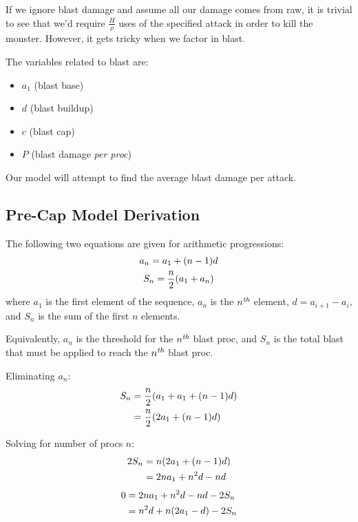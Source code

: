\documentclass{article}
\begin{document}
If we ignore blast damage and assume all our damage comes from raw, it is trivial to see that we'd require $\frac{H}{\rho}$ uses of the specified attack in order to kill the monster. However, it gets tricky when we factor in blast.

The variables related to blast are:
\begin{itemize}
    \item $a_1$ (blast base)
    \item $d$ (blast buildup)
    \item $c$ (blast cap)
    \item $P$ (blast damage \textit{per proc})
\end{itemize}

Our model will attempt to find the average blast damage per attack.


\subsection{Pre-Cap Model Derivation}%
\label{sub:pre_cap_model_derivation}

The following two equations are given for arithmetic progressions:
\begin{gather}
    a_n = a_1 + \parens*{n - 1} d
        \label{eq:arithmetic_progression_element}
    \\
    S_n = \frac{n}{2} \parens*{a_1 + a_n}
        \label{eq:arithmetic_progression_sum}
\end{gather}
where $a_1$ is the first element of the sequence, $a_n$ is the ${n}^\textit{th}$ element, $d = a_{i+1} - a_{i}$, and $S_n$ is the sum of the first $n$ elements.

Equivalently, $a_n$ is the threshold for the ${n}^\textit{th}$ blast proc, and $S_n$ is the total blast that must be applied to reach the ${n}^\textit{th}$ blast proc.

Eliminating $a_n$:
\begin{align}
    S_n &= \frac{n}{2} \parens*{a_1 + a_1 + \parens*{n - 1} d} \\
        &= \frac{n}{2} \parens*{2 a_1 + \parens*{n - 1} d}
\end{align}

Solving for number of procs $n$:
\begin{align}
    2 S_n &= n \parens*{2 a_1 + \parens*{n - 1} d} \\
          &= 2 n a_1 + n^2 d - n d
\end{align}
\begin{align}
    0 &= 2 n a_1 + n^2 d - n d - 2 S_n \\
      &= n^2 d + n \parens*{2 a_1 - d} - 2 S_n
\end{align}
\end{document}
